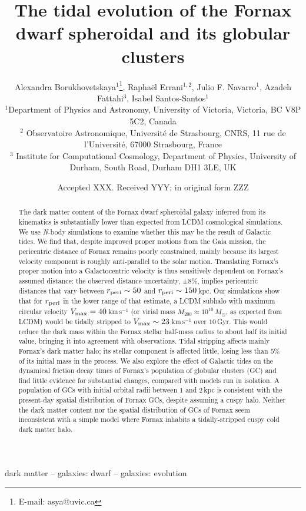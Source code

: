 \documentclass[fleqn,usenatbib]{mnras}
\title[Tidal evolution of the Fornax dSph]{The tidal evolution of the Fornax dwarf spheroidal and its globular clusters}
\author[A. Borukhovetskaya et al.]{
Alexandra Borukhovetskaya$^{1}$\thanks{E-mail: asya@uvic.ca},
Rapha\"{e}l Errani$^{1,2}$,  
Julio F. Navarro$^{1}$,
Azadeh Fattahi$^{3}$,
Isabel Santos-Santos$^{1}$
\\
$^{1}$Department of Physics and Astronomy, University of Victoria, Victoria, BC V8P 5C2, Canada\\
$^{2}$ Observatoire Astronomique, Universit\'e de Strasbourg, CNRS, 11 rue de l'Universit\'e, 67000 Strasbourg, France\\
$^{3}$ Institute for Computational Cosmology, Department of Physics, University of Durham, South Road, Durham DH1 3LE, UK
}
\date{Accepted XXX. Received YYY; in original form ZZZ}
\begin{document}
\label{firstpage}
\pagerange{\pageref{firstpage}--\pageref{lastpage}}
\maketitle

\begin{abstract}
The dark matter content of the Fornax dwarf spheroidal galaxy inferred from its kinematics is substantially lower than expected  from LCDM cosmological simulations.
We use \textit{N}-body simulations to examine whether this may be the result of Galactic tides. We find that, despite improved proper motions from the Gaia mission, the pericentric distance of Fornax remains poorly constrained, mainly because its largest velocity component is roughly anti-parallel to the solar motion. Translating Fornax's proper motion into a Galactocentric velocity is thus sensitively dependent on Fornax's assumed distance: the observed distance uncertainty, $\pm 8\%$, implies pericentric distances that vary between $r_{\rm peri}\sim 50$ and $r_{\rm peri}\sim 150$\,kpc. Our simulations show that for $r_{\rm peri}$ in the lower range of that estimate, a LCDM subhalo with maximum circular velocity $V_{\rm max}=40$\,km\,s$^{-1}$ (or virial mass $M_{200}\approx 10^{10}\, M_\odot$, as expected from LCDM) would be tidally stripped to $V_{\rm max} \sim 23$\,km\,s$^{-1}$ over $10$\,Gyr.  This would reduce the dark mass within the Fornax stellar half-mass radius to about half its initial value, bringing it into agreement with observations. Tidal stripping affects mainly Fornax's dark matter halo; its stellar component is affected little, losing less than $5\%$ of its initial mass in the process. We also explore the effect of Galactic tides on the dynamical friction decay times of Fornax's population of globular clusters (GC) and find little evidence for substantial changes, compared with models run in isolation. A population of GCs with initial orbital radii between $1$ and $2$\,kpc is consistent with the present-day spatial distribution of Fornax GCs, despite assuming a cuspy halo. Neither the dark matter content nor the spatial distribution of GCs of Fornax seem inconsistent with a simple model where Fornax inhabits a tidally-stripped cuspy cold dark matter halo.\end{abstract}

\begin{keywords}
dark matter -- galaxies: dwarf -- galaxies: evolution
\end{keywords}
\end{document}
